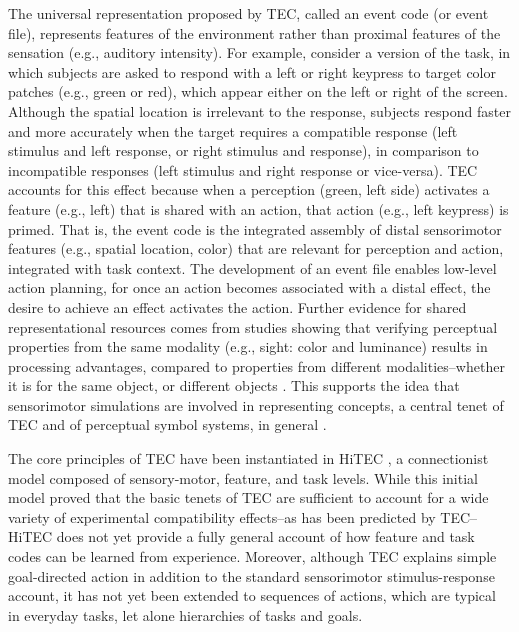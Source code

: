 \documentclass[10pt,letterpaper]{article}
\numberwithin{equation}{section}
\begin{document}
The universal representation proposed by TEC, called an event code (or event file), represents features of the environment rather than proximal features of the sensation (e.g., auditory intensity). For example, consider a version of the  task, in which subjects are asked to respond with a left or right keypress to target color patches (e.g., green or red), which appear either on the left or right of the screen. Although the spatial location is irrelevant to the response, subjects respond faster and more accurately when the target requires a compatible response (left stimulus and left response, or right stimulus and response), in comparison to incompatible responses (left stimulus and right response or vice-versa). TEC accounts for this effect because when a perception (green, left side) activates a feature (e.g., left) that is shared with an action, that action (e.g., left keypress) is primed. That is, the event code is the integrated assembly of distal sensorimotor features (e.g., spatial location, color) that are relevant for perception and action, integrated with task context. The development of an event file enables low-level action planning, for once an action becomes associated with a distal effect, the desire to achieve an effect activates the action. Further evidence for shared representational resources comes from studies showing that verifying perceptual properties from the same modality (e.g., sight: color and luminance) results in processing advantages, compared to properties from different modalities--whether it is for the same object, or different objects \cite{Pecher:2003,Pecher:2004}. This supports the idea that sensorimotor simulations are involved in representing concepts, a central tenet of TEC and of perceptual symbol systems, in general \cite{Barsalou:1999}.


The core principles of TEC have been instantiated in HiTEC \cite{Haazebroek:2011}, a connectionist model composed of sensory-motor, feature, and task levels. While this initial model proved that the basic tenets of TEC are sufficient to account for a wide variety of experimental compatibility effects--as has been predicted by TEC--HiTEC does not yet provide a fully general account of how feature and task codes can be learned from experience. Moreover, although TEC explains simple goal-directed action in addition to the standard sensorimotor stimulus-response account, it has not yet been extended to sequences of actions, which are typical in everyday tasks, let alone hierarchies of tasks and goals.
\end{document}
